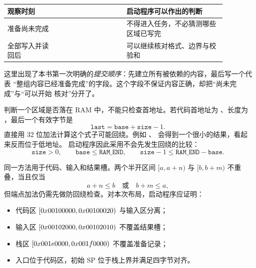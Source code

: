 \begin{longtable}{|L{0.20\linewidth}|L{0.28\linewidth}|L{0.40\linewidth}|}
\hline
{}
观察时刻 &  & 启动程序可以作出的判断 \\ \hline
准备尚未完成 &  & 不得进入任务，不必猜测哪些区域已写完 \\ \hline
全部写入并读回后 &  & 可以继续核对格式、边界与校验和 \\ \hline
\end{longtable}

这里出现了本书第一次明确的\emph{提交顺序}：先建立所有被依赖的内容，最后写一个代表
“整组内容已经准备完成”的字段。这个字段不保证内容正确，却把“尚未完成”与“可以开始
核对”分开了。

\begin{center}
\end{center}


判断一个区域是否落在 RAM 中，不能只检查首地址。若代码首地址为 、长度为
，最后一个有效字节是
\[
\texttt{last}=\texttt{base}+\texttt{size}-1.
\]
直接用 32 位加法计算这个式子可能回绕。例如
、 会得到一个很小的结果，看起来反而位于低地址。
启动程序因此采用不会先发生回绕的比较：
\[
\texttt{size}>0,\qquad
\texttt{base}\le \texttt{RAM\_END},\qquad
\texttt{size}-1\le \texttt{RAM\_END}-\texttt{base}.
\]

同一方法用于代码、输入和结果槽。两个半开区间
\([a,a+n)\) 与 \([b,b+m)\) 不重叠，当且仅当
\[
a+n\le b\quad\text{或}\quad b+m\le a,
\]
但端点加法仍需先做防回绕检查。对本次布局，启动程序应证明：

\begin{itemize}
\item 代码区 \([0x00100000,0x00100020)\) 与输入区分离；
\item 输入区 \([0x00102000,0x00102010)\) 不覆盖结果槽；
\item 栈区 \([0x001e0000,0x001f0000)\) 不覆盖准备记录；
\item 入口位于代码区，初始 SP 位于栈上界并满足四字节对齐。
\end{itemize}

